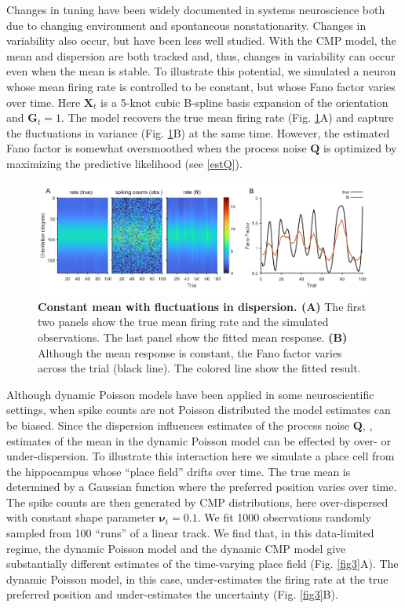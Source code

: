 \documentclass[aoas]{imsart}
\theoremstyle{plain}
\theoremstyle{remark}
\begin{document}
Changes in tuning have been widely documented in systems neuroscience both due to changing environment and spontaneous nonstationarity. Changes in variability also occur, but have been less well studied. With the CMP model, the mean and dispersion are both tracked and, thus, changes in variability can occur even when the mean is stable. To illustrate this potential, we simulated a neuron whose mean firing rate is controlled to be constant, but whose Fano factor varies over time. Here $\bm{X}_t$ is a 5-knot cubic B-spline basis expansion of the orientation and $\bm{G}_t = 1$. The model recovers the true mean firing rate (Fig. \ref{fig2}A) and capture the fluctuations in variance (Fig. \ref{fig2}B) at the same time. However, the estimated Fano factor is somewhat oversmoothed when the process noise $\bm{Q}$ is optimized by maximizing the predictive likelihood (see \ref{estQ}).

\begin{figure}[h!]
	\centering
	\includegraphics[width=1\textwidth]{figure2.png}
	\caption{\textbf{Constant mean with fluctuations in dispersion. (A)} The first two panels show the true mean firing rate and the simulated observations. The last panel show the fitted mean response. \textbf{(B)} Although the mean response is constant, the Fano factor varies across the trial (black line). The colored line show the fitted result.}
	\label{fig2}
\end{figure}

Although dynamic Poisson models have been applied in some neuroscientific settings, when spike counts are not Poisson distributed the model estimates can be biased. Since the dispersion influences estimates of the process noise $\bm{Q}$, , estimates of the mean in the dynamic Poisson model can be effected by over- or under-dispersion. To illustrate this interaction here we simulate a place cell from the hippocampus whose “place field” drifts over time. The true mean is determined by a Gaussian function where the preferred position varies over time. The spike counts are then generated by CMP distributions, here over-dispersed with constant shape parameter $\bm{\nu}_t = 0.1$. We fit 1000 observations randomly sampled from 100 “runs” of a linear track. We find that, in this data-limited regime, the dynamic Poisson model and the dynamic CMP model give substantially different estimates of the time-varying place field (Fig. \ref{fig3}A). The dynamic Poisson model, in this case, under-estimates the firing rate at the true preferred position and under-estimates the uncertainty (Fig. \ref{fig3}B). 
\end{document}
